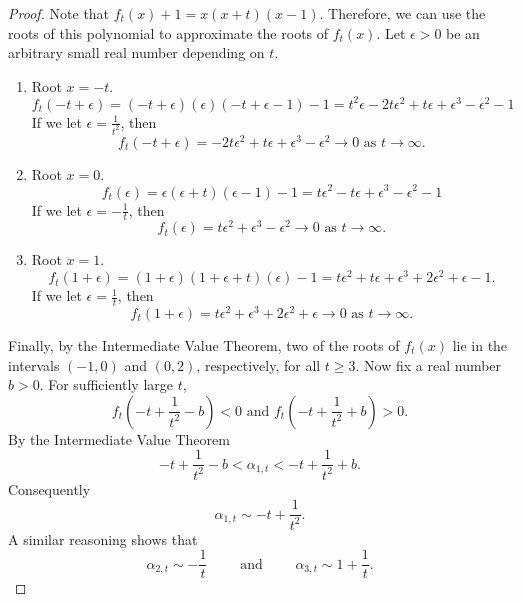 \documentclass[11pt]{amsart}
\numberwithin{equation}{section}
\theoremstyle{definition}
\begin{document}
\begin{proof}
    Note that $f_t(x) + 1 = x(x + t)(x-1)$. Therefore, we can use the roots of this polynomial to approximate the roots of $f_t(x)$. Let $\epsilon > 0$ be an arbitrary small real number depending on $t$. 
    \begin{enumerate}
    \item Root $x = -t$.
            \begin{equation*}
                f_t(-t + \epsilon) = (-t+\epsilon)(\epsilon)(-t+\epsilon -1) -1 =t^2\epsilon - 2 t \epsilon^2 + t\epsilon + \epsilon^3 - \epsilon^2 -1
            \end{equation*}
            If we let $\epsilon = \frac{1}{t^2}$, then
            \begin{equation*}
                f_t(-t + \epsilon) = - 2 t \epsilon^2 + t\epsilon + \epsilon^3 - \epsilon^2 \to 0 \text{ as } t \to \infty.
            \end{equation*}
    
        
    \item Root $x = 0$.
    \begin{equation*}
        f_t(\epsilon) = \epsilon(\epsilon + t)(\epsilon -1) -1 = t\epsilon^2 - t\epsilon + \epsilon^3 - \epsilon^2 -1
    \end{equation*}
    If we let $\epsilon = - \frac{1}{t}$, then
    \begin{equation*}
        f_t(\epsilon) =  t\epsilon^2 + \epsilon^3 - \epsilon^2 \to 0 \text{ as } t \to \infty.
    \end{equation*}
    
    \item Root $x = 1$.
    \begin{equation*}
        f_t(1 +\epsilon) = (1 + \epsilon)(1+ \epsilon + t)(\epsilon) -1 = t\epsilon^2 + t\epsilon + \epsilon^3 + 2\epsilon^2 + \epsilon -1.
    \end{equation*}
    If we let $\epsilon = \frac{1}{t}$, then
    \begin{equation*}
        f_t(1+ \epsilon) = t\epsilon^2 + \epsilon^3 + 2\epsilon^2 + \epsilon \to 0 \text{ as } t \to \infty.
    \end{equation*}
    \end{enumerate}
    Finally, by the Intermediate Value Theorem, two of the roots of $f_t(x)$ lie in the intervals $(-1,0)$ and $(0,2)$, respectively, for all $t\geq 3$. Now fix a real number $b > 0$. For sufficiently large $t$,
    \[
        f_t\left( -t + \frac{1}{t^2} - b\right) < 0  \text{ and }  f_t\left( -t + \frac{1}{t^2} + b\right) > 0.
    \]
    By the Intermediate Value Theorem
    \[
        -t + \frac{1}{t^2} - b < \alpha_{1,t} < -t + \frac{1}{t^2} + b.
    \]
    Consequently
    \[
        \alpha_{1,t} \sim -t + \frac{1}{t^2}.
    \]
    A similar reasoning shows that
    \[
         \alpha_{2,t} \sim -\frac{1}{t} \qquad \text{ and } \qquad \alpha_{3,t} \sim 1 + \frac{1}{t}.
    \]
\end{proof}
\end{document}
